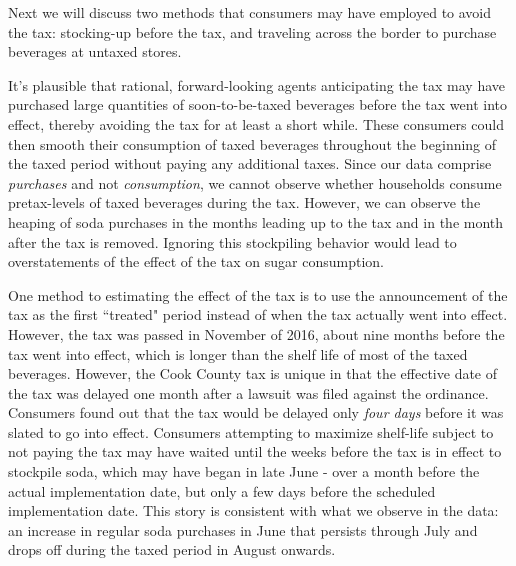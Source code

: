 \documentclass[12pt]{article}
\begin{document}

Next we will discuss two methods that consumers may have employed to avoid the tax: stocking-up before the tax, and traveling across the border to purchase beverages at untaxed stores.

It's plausible that rational, forward-looking agents anticipating the tax may have purchased large quantities of soon-to-be-taxed beverages before the tax went into effect, thereby avoiding the tax for at least a short while. These consumers could then smooth their consumption of taxed beverages throughout the beginning of the taxed period without paying any additional taxes. Since our data comprise \textit{purchases} and not \textit{consumption}, we cannot observe whether households consume pretax-levels of taxed beverages during the tax. However, we can observe the heaping of soda purchases in the months leading up to the tax and in the month after the tax is removed. Ignoring this stockpiling behavior would lead to overstatements of the effect of the tax on sugar consumption.

One method to estimating the effect of the tax is to use the announcement of the tax as the first ``treated" period instead of when the tax actually went into effect. However, the tax was passed in November of 2016, about nine months before the tax went into effect, which is longer than the shelf life of most of the taxed beverages. However, the Cook County tax is unique in that the effective date of the tax was delayed one month after a lawsuit was filed against the ordinance. Consumers found out that the tax would be delayed only \textit{four days} before it was slated to go into effect. Consumers attempting to maximize shelf-life subject to not paying the tax may have waited until the weeks before the tax is in effect to stockpile soda, which may have began in late June - over a month before the actual implementation date, but only a few days before the scheduled implementation date. This story is consistent with what we observe in the data: an increase in regular soda purchases in June that persists through July and drops off during the taxed period in August onwards.
\end{document}
